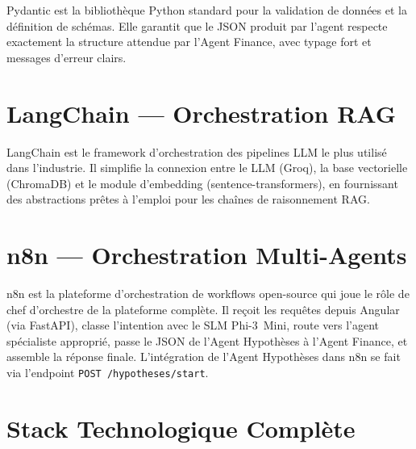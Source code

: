 \documentclass[12pt, a4paper]{report}
\begin{document}
Pydantic est la bibliothèque Python standard pour la validation de données et la définition de schémas. Elle garantit que le JSON produit par l'agent respecte exactement la structure attendue par l'Agent Finance, avec typage fort et messages d'erreur clairs.

\section{LangChain — Orchestration RAG}

LangChain est le framework d'orchestration des pipelines LLM le plus utilisé dans l'industrie. Il simplifie la connexion entre le LLM (Groq), la base vectorielle (ChromaDB) et le module d'embedding (sentence-transformers), en fournissant des abstractions prêtes à l'emploi pour les chaînes de raisonnement RAG.

\section{n8n — Orchestration Multi-Agents}

n8n est la plateforme d'orchestration de workflows open-source qui joue le rôle de chef d'orchestre de la plateforme complète. Il reçoit les requêtes depuis Angular (via FastAPI), classe l'intention avec le SLM Phi-3~Mini, route vers l'agent spécialiste approprié, passe le JSON de l'Agent Hypothèses à l'Agent Finance, et assemble la réponse finale. L'intégration de l'Agent Hypothèses dans n8n se fait via l'endpoint \texttt{POST /hypotheses/start}.

\section{Stack Technologique Complète}
\end{document}
